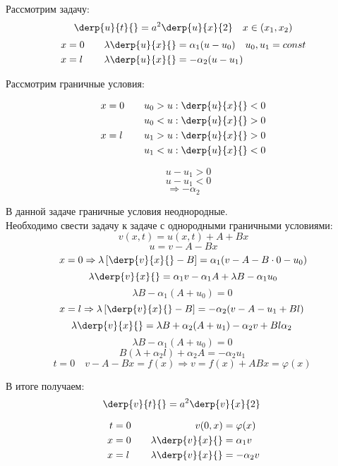 Рассмотрим задачу:\\
\[
	\derp{u}{t}{} = a^2 \derp{u}{x}{2} \quad x \in (x_1, x_2)
\]
\begin{alignat*}{2}
	x &= 0 &\quad \lambda \derp{u}{x}{} &= \alpha_1 (u - u_0) \quad u_0, u_1 = const\\
	x &= l &\quad \lambda \derp{u}{x}{} &= - \alpha_2 (u - u_1)
\end{alignat*}

Рассмотрим граничные условия:
\begin{multicols}{2}

\begin{alignat*}{2}
     x &= 0 &\quad u_0 > u : \derp{u}{x}{} < 0\\
            &&\quad u_0 < u : \derp{u}{x}{} > 0\\
     x &= l &\quad u_1 > u : \derp{u}{x}{} > 0 \\
            &&\quad u_1 < u : \derp{u}{x}{} < 0
\end{alignat*}

\[
	\quad u - u_1 > 0 
\]
\[
	\quad u - u_1 < 0
\]
\[
	\Rightarrow - \alpha_2
\]
\end{multicols}

В данной задаче граничные условия неоднородные.\\
Необходимо свести задачу к задаче с однородными граничными условиями:\\
\[
	v (x, t) = u(x, t) + A + Bx
\]
\[
	u = v - A - Bx
\]
\[
	x = 0 \Rightarrow \lambda \left[\derp{v}{x}{} - B \right] = \alpha_1 (v - A - B \cdot 0 - u_0)
\]
\[
	\lambda \derp{v}{x}{} = \alpha_1 v - \alpha_1 A +\lambda B - \alpha_1 u_0
\]
\[
	\lambda B - \alpha_1(A + u_0) = 0\
\]
\[
	x = l \Rightarrow \lambda \left[\derp{v}{x}{} - B \right] = - \alpha_2 (v - A - u_1 + Bl)\
\]
\[
	\lambda \derp{v}{x}{} = \lambda B + \alpha_2 (A + u_1) - \alpha_2 v + Bl \alpha_2\
\]
\[
	\lambda B - \alpha_1 (A + u_0) = 0\
\]
\[
	B (\lambda + \alpha_2 l) + \alpha_2 A = - \alpha_2 u_1\
\]
\[
	t = 0 \quad v - A - Bx = f(x) \Rightarrow v = f(x) + A Bx = \varphi(x)\
\]

В итоге получаем:\\
\[
	\derp{v}{t}{} = a^2 \derp{v}{x}{2}\
\]

	\begin{alignat*}{2}
	    t &= 0 &\quad v(0, x) &= \varphi (x)\\
	    x &= 0 &\quad \lambda \derp{v}{x}{} &= \alpha_1 v\\
	    x &= l &\quad \lambda \derp{v}{x}{} &= - \alpha_2 v\\
	\end{alignat*}

